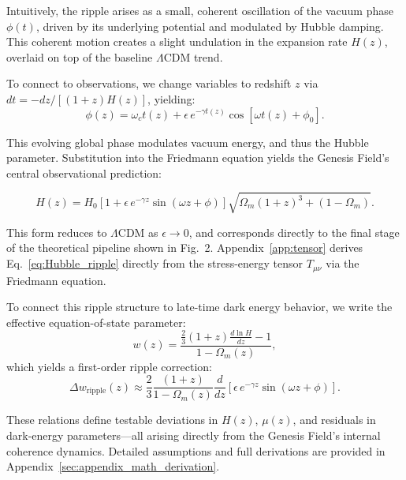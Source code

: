 Intuitively, the ripple arises as a small, coherent oscillation of the vacuum phase \( \phi(t) \), driven by its underlying potential and modulated by Hubble damping. This coherent motion creates a slight undulation in the expansion rate \( H(z) \), overlaid on top of the baseline \(\Lambda\)CDM trend.

To connect to observations, we change variables to redshift \( z \) via \( dt = -dz/[(1+z)H(z)] \), yielding:
\begin{equation}
\phi(z) = \omega_c t(z) + \epsilon\, e^{-\gamma t(z)}\cos[\omega t(z) + \phi_0].
\label{eq:phi_redshift}
\end{equation}

This evolving global phase modulates vacuum energy, and thus the Hubble parameter. Substitution into the Friedmann equation yields the Genesis Field's central observational prediction:

\begin{tcolorbox}[colback=gray!7, colframe=black, title=Genesis Field Prediction for $H(z)$]
\begin{equation}
H(z) = H_0\left[1 + \epsilon\, e^{-\gamma z}\sin(\omega z + \phi)\right]\sqrt{\Omega_m(1+z)^3 + (1-\Omega_m)}.
\label{eq:Hubble_ripple}
\end{equation}
\end{tcolorbox}

This form reduces to \(\Lambda\)CDM as \( \epsilon \to 0 \), and corresponds directly to the final stage of the theoretical pipeline shown in Fig.~2. Appendix~\ref{app:tensor} derives Eq.~\eqref{eq:Hubble_ripple} directly from the stress-energy tensor \( T_{\mu\nu} \) via the Friedmann equation.

To connect this ripple structure to late-time dark energy behavior, we write the effective equation-of-state parameter:
\begin{equation}
w(z) = \frac{\frac{2}{3}(1+z)\frac{d\ln H}{dz} - 1}{1 - \Omega_m(z)},
\label{eq:w_z}
\end{equation}
which yields a first-order ripple correction:
\begin{equation}
\Delta w_{\text{ripple}}(z) \approx \frac{2}{3} \frac{(1+z)}{1 - \Omega_m(z)} \frac{d}{dz} \left[\epsilon\, e^{-\gamma z}\sin(\omega z + \phi)\right].
\label{eq:delta_w}
\end{equation}

These relations define testable deviations in \( H(z) \), \( \mu(z) \), and residuals in dark-energy parameters—all arising directly from the Genesis Field’s internal coherence dynamics. Detailed assumptions and full derivations are provided in Appendix~\ref{sec:appendix_math_derivation}.

